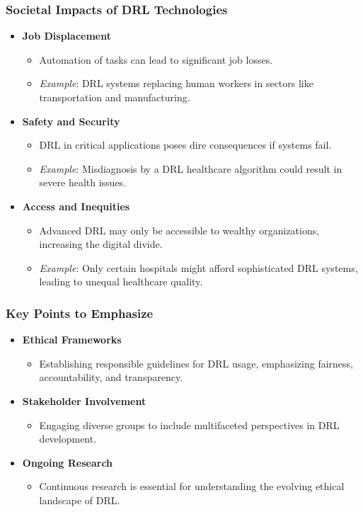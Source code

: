 \documentclass[aspectratio=169]{beamer}
\begin{document}
\begin{frame}[fragile]
    \frametitle{Societal Impacts of DRL Technologies}
    \begin{itemize}
        \item \textbf{Job Displacement}
            \begin{itemize}
                \item Automation of tasks can lead to significant job losses.
                \item \textit{Example}: DRL systems replacing human workers in sectors like transportation and manufacturing.
            \end{itemize}
        \item \textbf{Safety and Security}
            \begin{itemize}
                \item DRL in critical applications poses dire consequences if systems fail.
                \item \textit{Example}: Misdiagnosis by a DRL healthcare algorithm could result in severe health issues.
            \end{itemize}
        \item \textbf{Access and Inequities}
            \begin{itemize}
                \item Advanced DRL may only be accessible to wealthy organizations, increasing the digital divide.
                \item \textit{Example}: Only certain hospitals might afford sophisticated DRL systems, leading to unequal healthcare quality.
            \end{itemize}
    \end{itemize}
\end{frame}

\begin{frame}[fragile]
    \frametitle{Key Points to Emphasize}
    \begin{itemize}
        \item \textbf{Ethical Frameworks}
            \begin{itemize}
                \item Establishing responsible guidelines for DRL usage, emphasizing fairness, accountability, and transparency.
            \end{itemize}
        \item \textbf{Stakeholder Involvement}
            \begin{itemize}
                \item Engaging diverse groups to include multifaceted perspectives in DRL development.
            \end{itemize}
        \item \textbf{Ongoing Research}
            \begin{itemize}
                \item Continuous research is essential for understanding the evolving ethical landscape of DRL.
            \end{itemize}
    \end{itemize}
\end{frame}
\end{document}

